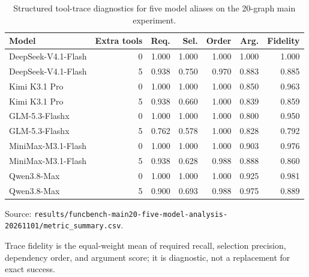 \begin{table}[htbp]
\centering
\caption{Structured tool-trace diagnostics for five model aliases on the 20-graph main experiment.}
\label{tab:trace}
\footnotesize
\setlength{\tabcolsep}{3pt}
\renewcommand{\arraystretch}{1.08}
\begin{tabularx}{\textwidth}{>{\raggedright\arraybackslash}Xrrrrrr}
\toprule
Model & Extra tools & Req. & Sel. & Order & Arg. & Fidelity \\
\midrule
DeepSeek-V4.1-Flash & 0 & 1.000 & 1.000 & 1.000 & 1.000 & 1.000 \\
DeepSeek-V4.1-Flash & 5 & 0.938 & 0.750 & 0.970 & 0.883 & 0.885 \\
Kimi K3.1 Pro & 0 & 1.000 & 1.000 & 1.000 & 0.850 & 0.963 \\
Kimi K3.1 Pro & 5 & 0.938 & 0.660 & 1.000 & 0.839 & 0.859 \\
GLM-5.3-Flashx & 0 & 1.000 & 1.000 & 1.000 & 0.800 & 0.950 \\
GLM-5.3-Flashx & 5 & 0.762 & 0.578 & 1.000 & 0.828 & 0.792 \\
MiniMax-M3.1-Flash & 0 & 1.000 & 1.000 & 1.000 & 0.903 & 0.976 \\
MiniMax-M3.1-Flash & 5 & 0.938 & 0.628 & 0.988 & 0.888 & 0.860 \\
Qwen3.8-Max & 0 & 1.000 & 1.000 & 1.000 & 0.925 & 0.981 \\
Qwen3.8-Max & 5 & 0.900 & 0.693 & 0.988 & 0.975 & 0.889 \\
\bottomrule
\end{tabularx}
\par\parbox{\linewidth}{\raggedright\footnotesize Source: \texttt{results/\allowbreak{}funcbench-main20-five-model-analysis-20261101/\allowbreak{}metric\_summary.csv}.}
\par\parbox{\linewidth}{\raggedright\footnotesize Trace fidelity is the equal-weight mean of required recall, selection precision, dependency order, and argument score; it is diagnostic, not a replacement for exact success.}
\end{table}
